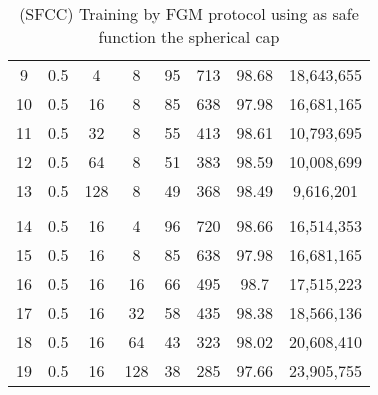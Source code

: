 \begin{table}[H]
\begin{tabular}{|c|c|c|c|c|c|c|c|}
        9                      & 0.5                   & 4                     & 8                     & 95                    & 713                   & 98.68                 & 18,643,655               \\
        10                     & 0.5                   & 16                    & 8                     & 85                    & 638                   & 97.98                 & 16,681,165               \\
        11                     & 0.5                   & 32                    & 8                     & 55                    & 413                   & 98.61                 & 10,793,695               \\
        12                     & 0.5                   & 64                    & 8                     & 51                    & 383                   & 98.59                 & 10,008,699               \\
        13                     & 0.5                   & 128                   & 8                     & 49                    & 368                   & 98.49                 & 9,616,201                \\
        \hline
        \multicolumn{1}{|l|}{} & \multicolumn{1}{l|}{} & \multicolumn{1}{l|}{} & \multicolumn{1}{l|}{} & \multicolumn{1}{l|}{} & \multicolumn{1}{l|}{} & \multicolumn{1}{l|}{} & \multicolumn{1}{l|}{}    \\
        \hline
        14                     & 0.5                   & 16                    & 4                     & 96                    & 720                   & 98.66                 & 16,514,353               \\
        15                     & 0.5                   & 16                    & 8                     & 85                    & 638                   & 97.98                 & 16,681,165               \\
        16                     & 0.5                   & 16                    & 16                    & 66                    & 495                   & 98.7                  & 17,515,223               \\
        17                     & 0.5                   & 16                    & 32                    & 58                    & 435                   & 98.38                 & 18,566,136               \\
        18                     & 0.5                   & 16                    & 64                    & 43                    & 323                   & 98.02                 & 20,608,410               \\
        19                     & 0.5                   & 16                    & 128                   & 38                    & 285                   & 97.66                 & 23,905,755               \\
        \hline
    \end{tabular}
    \caption{(SFCC) Training by FGM protocol using as safe function the spherical cap}
    \label{tab:table-fgm-sf2-class-exp}
\end{table}

